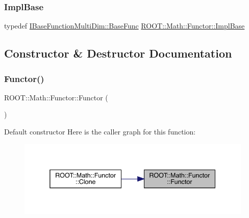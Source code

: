 \subsubsection{\texorpdfstring{ImplBase}{ImplBase}\hspace{0.1cm}{\footnotesize\ttfamily [2/2]}}
{\footnotesize\ttfamily typedef \mbox{\hyperlink{classROOT_1_1Math_1_1IBaseFunctionMultiDim_a44c87c3e8c23d140cc3bf067d6480070}{I\+Base\+Function\+Multi\+Dim\+::\+Base\+Func}} \mbox{\hyperlink{classROOT_1_1Math_1_1Functor_acc5dacb213f26296122e95138f5153b3}{R\+O\+O\+T\+::\+Math\+::\+Functor\+::\+Impl\+Base}}}



\subsection{Constructor \& Destructor Documentation}
\mbox{\label{classROOT_1_1Math_1_1Functor_a2330648eca94b53b3ba613e49d03927f}} 
\subsubsection{\texorpdfstring{Functor()}{Functor()}\hspace{0.1cm}{\footnotesize\ttfamily [1/8]}}
{\footnotesize\ttfamily R\+O\+O\+T\+::\+Math\+::\+Functor\+::\+Functor (\begin{DoxyParamCaption}{ }\end{DoxyParamCaption})\hspace{0.3cm}{\ttfamily [inline]}}

Default constructor Here is the caller graph for this function\+:\nopagebreak
\begin{figure}[H]
\begin{center}
\leavevmode
\includegraphics[width=338pt]{da/d8e/classROOT_1_1Math_1_1Functor_a2330648eca94b53b3ba613e49d03927f_icgraph}
\end{center}
\end{figure}
\mbox{\label{classROOT_1_1Math_1_1Functor_ad6dbce8351bd8c74e6754215a3ccac41}} 

